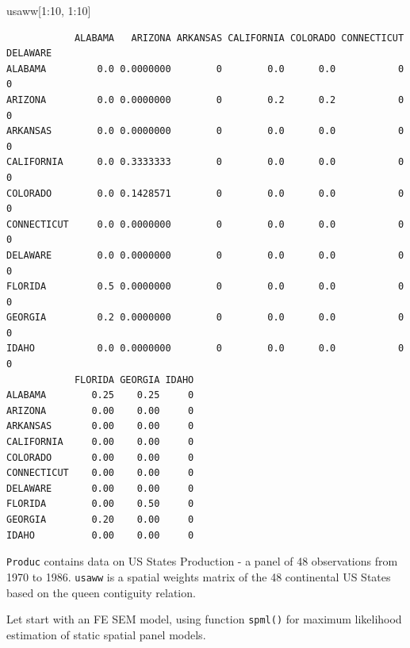 \documentclass[
  letterpaper,
]{scrbook}
\newenvironment{Shaded}{\begin{snugshade}}{\end{snugshade}}
\newcommand{\DecValTok}[1]{\textcolor[rgb]{0.68,0.00,0.00}{#1}}
\newcommand{\NormalTok}[1]{\textcolor[rgb]{0.00,0.23,0.31}{#1}}
\newcommand{\SpecialCharTok}[1]{\textcolor[rgb]{0.37,0.37,0.37}{#1}}
\begin{document}
\begin{Shaded}
\begin{Highlighting}[]
\NormalTok{usaww[}\DecValTok{1}\SpecialCharTok{:}\DecValTok{10}\NormalTok{, }\DecValTok{1}\SpecialCharTok{:}\DecValTok{10}\NormalTok{]}
\end{Highlighting}
\end{Shaded}

\begin{verbatim}
            ALABAMA   ARIZONA ARKANSAS CALIFORNIA COLORADO CONNECTICUT DELAWARE
ALABAMA         0.0 0.0000000        0        0.0      0.0           0        0
ARIZONA         0.0 0.0000000        0        0.2      0.2           0        0
ARKANSAS        0.0 0.0000000        0        0.0      0.0           0        0
CALIFORNIA      0.0 0.3333333        0        0.0      0.0           0        0
COLORADO        0.0 0.1428571        0        0.0      0.0           0        0
CONNECTICUT     0.0 0.0000000        0        0.0      0.0           0        0
DELAWARE        0.0 0.0000000        0        0.0      0.0           0        0
FLORIDA         0.5 0.0000000        0        0.0      0.0           0        0
GEORGIA         0.2 0.0000000        0        0.0      0.0           0        0
IDAHO           0.0 0.0000000        0        0.0      0.0           0        0
            FLORIDA GEORGIA IDAHO
ALABAMA        0.25    0.25     0
ARIZONA        0.00    0.00     0
ARKANSAS       0.00    0.00     0
CALIFORNIA     0.00    0.00     0
COLORADO       0.00    0.00     0
CONNECTICUT    0.00    0.00     0
DELAWARE       0.00    0.00     0
FLORIDA        0.00    0.50     0
GEORGIA        0.20    0.00     0
IDAHO          0.00    0.00     0
\end{verbatim}

\texttt{Produc} contains data on US States Production - a panel of 48
observations from 1970 to 1986. \texttt{usaww} is a spatial weights
matrix of the 48 continental US States based on the queen contiguity
relation.

Let start with an FE SEM model, using function \texttt{spml()} for
maximum likelihood estimation of static spatial panel models.
\end{document}
